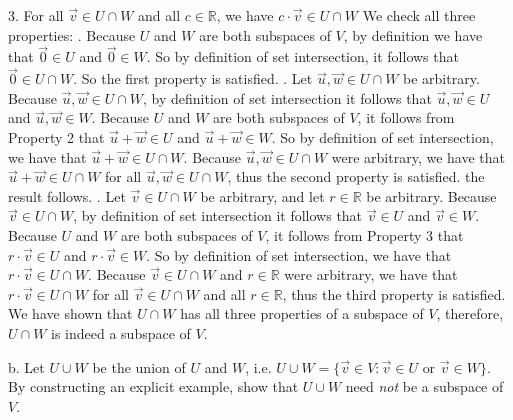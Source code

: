 \documentclass[12pt]{article}
\newenvironment{problem}[2][Problem]
{
	\begin{trivlist} 
		\item[\hskip \labelsep {\bfseries #1 #2:}]
	}
{
	\end{trivlist}
	}
\newenvironment{solution}[1][Solution]
{
	\begin{trivlist} 
		\item[\hskip \labelsep {\itshape #1:}]
	}
	{
	\end{trivlist}
}
\begin{document}
\begin{problem}{2}
\begin{solution}
3. For all $\vec{v} \in U\cap W$ and all $c \in \mathbb{R}$, we have $c\cdot \vec{v} \in U \cap W$
\noindent
\newline
\newline
We check all three properties:
\newline
{}. Because $U$ and $W$ are both subspaces of $V$, by definition we have that $\vec{0} \in U$ and $\vec{0} \in W$. So by definition of set intersection, it follows that $\vec{0} \in U \cap W$. So the first property is satisfied.
\newline
{}. Let $\vec{u},\vec{w} \in U \cap W$ be arbitrary. Because $\vec{u},\vec{w} \in U \cap W$, by definition of set intersection it follows that $\vec{u},\vec{w} \in U$ and $\vec{u},\vec{w} \in W$. Because $U$ and $W$ are both subspaces of $V$, it follows from Property 2 that $\vec{u}+\vec{w} \in U$ and $\vec{u}+\vec{w} \in W$. So by definition of set intersection, we have that $\vec{u}+\vec{w} \in U\cap W$. Because $\vec{u},\vec{w} \in U\cap W$ were arbitrary, we have that $\vec{u}+\vec{w} \in U\cap W$ for all $\vec{u},\vec{w} \in U\cap W$, thus the second property is satisfied. the result follows.
\newline
{}. Let $\vec{v} \in U\cap W$ be arbitrary, and let $r \in \mathbb{R}$ be arbitrary. Because $\vec{v} \in U\cap W$, by definition of set intersection it follows that $\vec{v} \in U$ and $\vec{v} \in W$. Because $U$ and $W$ are both subspaces of $V$, it follows from Property 3 that $r\cdot \vec{v} \in U$ and $r\cdot \vec{v} \in W$. So by definition of set intersection, we have that $r\cdot \vec{v} \in U\cap W$. Because $\vec{v} \in U\cap W$ and $r\in \mathbb{R}$ were arbitrary, we have that $r\cdot \vec{v} \in U\cap W$ for all $\vec{v} \in U\cap W$ and all $r\in \mathbb{R}$, thus the third property is satisfied.
\noindent
\newline
\newline
We have shown that $U\cap W$ has all three properties of a subspace of $V$, therefore, $U\cap W$ is indeed a subspace of $V$.
\end{solution}
\noindent
\newline
\newline
b. Let $U\cup W$ be the union of $U$ and $W$, i.e. $U \cup W = \{ \vec{v} \in V: \vec{v}\in U \text{ or } \vec{v}\in W \}$. By constructing an explicit example, show that $U\cup W$ need {\it not} be a subspace of $V$. 
\begin{solution}

\end{solution}
\end{problem}
\end{document}

